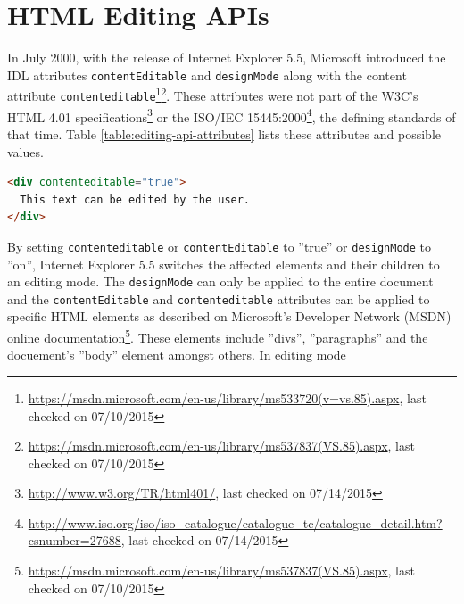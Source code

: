 \section{HTML Editing APIs}
\label{sec:html-editing-apis}

In July 2000, with the release of Internet Explorer 5.5, Microsoft introduced the IDL attributes \texttt{contentEditable} and \texttt{designMode} along with the content attribute \texttt{contenteditable}\footnote{\url{https://msdn.microsoft.com/en-us/library/ms533720(v=vs.85).aspx}, last checked on 07/10/2015}\footnote{\url{https://msdn.microsoft.com/en-us/library/ms537837(VS.85).aspx}, last checked on 07/10/2015}. These attributes were not part of the W3C's HTML 4.01 specifications\footnote{\url{http://www.w3.org/TR/html401/}, last checked on 07/14/2015} or the ISO/IEC 15445:2000\footnote{\url{http://www.iso.org/iso/iso\_catalogue/catalogue\_tc/catalogue\_detail.htm?csnumber=27688}, last checked on 07/14/2015}, the defining standards of that time. Table \ref{table:editing-api-attributes} lists these attributes and possible values.

\begin{table}[]
\centering
{}
\caption{Editing API attributes}
\label{table:editing-api-attributes}
\end{table}

\begin{lstlisting}[language=html, caption=An element set to editing mode, label=lst:div-contenteditable]
<div contenteditable="true">
  This text can be edited by the user.
</div>
\end{lstlisting}

By setting \texttt{contenteditable} or \texttt{contentEditable} to ''true'' or \texttt{designMode} to ''on'', Internet Explorer 5.5 switches the affected elements and their children to an editing mode. The \texttt{designMode} can only be applied to the entire document and the \texttt{contentEditable} and \texttt{contenteditable} attributes can be applied to specific HTML elements as described on Microsoft's Developer Network (MSDN) online documentation\footnote{\url{https://msdn.microsoft.com/en-us/library/ms537837(VS.85).aspx}, last checked on 07/10/2015}. These elements include ''divs'', ''paragraphs'' and the docuement's ''body'' element amongst others. In editing mode

